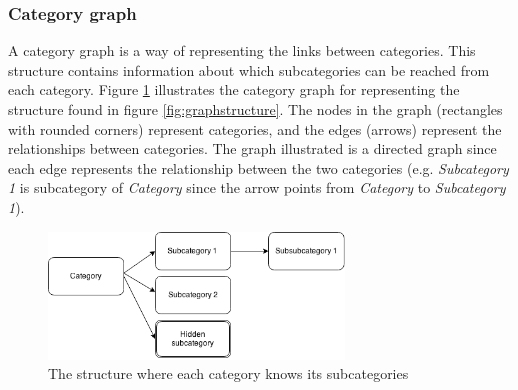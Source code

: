 \subsubsection{Category graph}
A category graph is a way of representing the links between categories. This structure contains information about which subcategories can be reached from each category. Figure \ref{fig:categorystructure} illustrates the category graph for representing the structure found in figure \ref{fig:graphstructure}. The nodes in the graph (rectangles with rounded corners) represent categories, and the edges (arrows) represent the relationships between categories. The graph illustrated is a directed graph since each edge represents the relationship between the two categories (e.g. \emph{Subcategory 1} is subcategory of \emph{Category} since the arrow points from \emph{Category} to \emph{Subcategory 1}).

\begin{figure}[h]
\centering
\includegraphics[width=0.7\textwidth]{Chapters/Methods/category-subcategories}
\caption{The structure where each category knows its subcategories}
\label{fig:categorystructure}
\end{figure}

